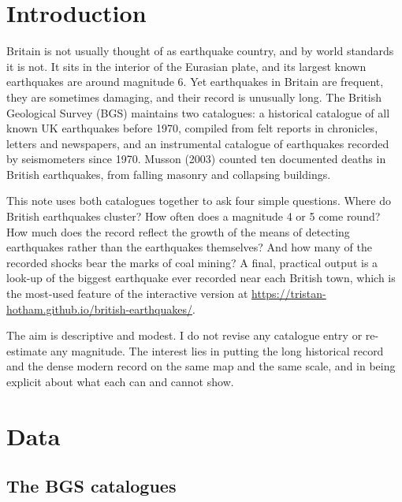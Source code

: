 \documentclass[11pt,a4paper]{article}
\begin{document}
\section{Introduction}

Britain is not usually thought of as earthquake country, and by world standards it is not. It sits in the interior of the Eurasian plate, and its largest known earthquakes are around magnitude 6. Yet earthquakes in Britain are frequent, they are sometimes damaging, and their record is unusually long. The British Geological Survey (BGS) maintains two catalogues: a historical catalogue of all known UK earthquakes before 1970, compiled from felt reports in chronicles, letters and newspapers, and an instrumental catalogue of earthquakes recorded by seismometers since 1970. Musson (2003) counted ten documented deaths in British earthquakes, from falling masonry and collapsing buildings.

This note uses both catalogues together to ask four simple questions. Where do British earthquakes cluster? How often does a magnitude 4 or 5 come round? How much does the record reflect the growth of the means of detecting earthquakes rather than the earthquakes themselves? And how many of the recorded shocks bear the marks of coal mining? A final, practical output is a look-up of the biggest earthquake ever recorded near each British town, which is the most-used feature of the interactive version at \url{https://tristan-hotham.github.io/british-earthquakes/}.

The aim is descriptive and modest. I do not revise any catalogue entry or re-estimate any magnitude. The interest lies in putting the long historical record and the dense modern record on the same map and the same scale, and in being explicit about what each can and cannot show.

\section{Data}

\subsection{The BGS catalogues}
\end{document}
